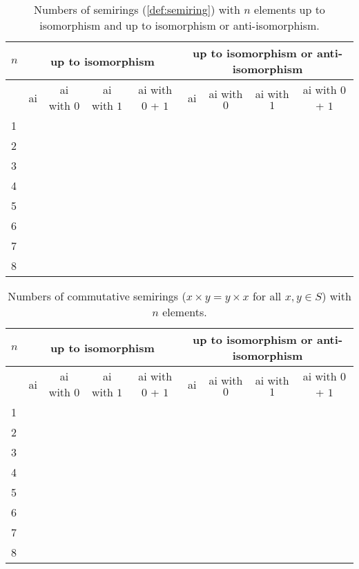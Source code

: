 \documentclass{article}
\theoremstyle{definition}
\theoremstyle{plain}
\begin{document}
\begin{table}[ht]
  \centering
  \begin{tabular}{l|r|r|r|r|r|r|r|r}
    $n$
    & \multicolumn{4}{c|}{up to isomorphism}
    & \multicolumn{4}{c}{up to isomorphism or anti-isomorphism} \\
    \midrule
    & \multicolumn{1}{c|}{ai} & \multicolumn{1}{c|}{ai with $0$}
    & \multicolumn{1}{c|}{ai with $1$} & \multicolumn{1}{c|}{ai with $0$ + $1$}
    & \multicolumn{1}{c|}{ai} & \multicolumn{1}{c}{ai with $0$}
    & \multicolumn{1}{c|}{ai with $1$} & \multicolumn{1}{c|}{ai with $0$ + $1$}
    \\
    \midrule
    1 &              &          &&&          &       \\
    2 &              &          &&&          &       \\
    3 &             &         &&&          &       \\
    4 &            &        &&&         & \\
    5 &         &      &&&        & \\
    6 &        &    &&&      & \\
    7 &      &  &&&     & \\
    8 & & &&&    & \\
  \end{tabular}
  \caption{Numbers of semirings (\cref{def:semiring}) with $n$ elements up to
  isomorphism and up to isomorphism or anti-isomorphism.}\label{tab:semirings}
  \label{tab:semirings}
\end{table}

\begin{table}[ht]
  \centering
  \begin{tabular}{l|r|r|r|r|r|r|r|r}
    $n$
    & \multicolumn{4}{c|}{up to isomorphism}
    & \multicolumn{4}{c}{up to isomorphism or anti-isomorphism} \\
    \midrule
    & \multicolumn{1}{c|}{ai} & \multicolumn{1}{c|}{ai with $0$}
    & \multicolumn{1}{c|}{ai with $1$} & \multicolumn{1}{c|}{ai with $0$ + $1$}
    & \multicolumn{1}{c|}{ai} & \multicolumn{1}{c}{ai with $0$}
    & \multicolumn{1}{c|}{ai with $1$} & \multicolumn{1}{c|}{ai with $0$ + $1$}
    \\
    \midrule
    1 &              &          &&&          &       \\
    2 &              &          &&&          &       \\
    3 &             &         &&&          &       \\
    4 &            &        &&&         & \\
    5 &         &      &&&        & \\
    6 &        &    &&&      & \\
    7 &      &  &&&     & \\
    8 & & &&&    & \\
  \end{tabular}
  \caption{Numbers of commutative semirings ($x\times y = y \times
  x$ for all $x,y\in S$) with $n$ elements.}
  \label{tab:comm-semirings}
\end{table}
\end{document}
